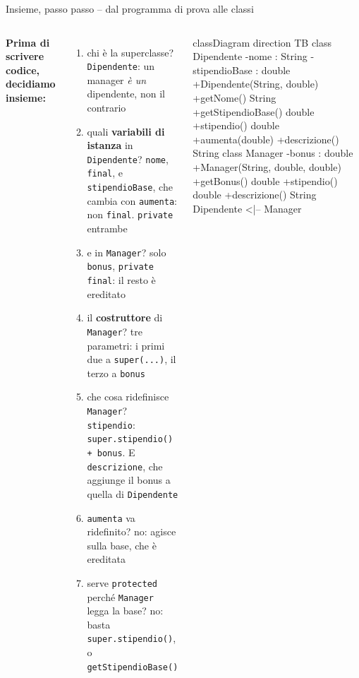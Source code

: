 \documentclass[10pt,aspectratio=169]{beamer}
\begin{document}
\begin{frame}[fragile]{Insieme, passo passo -- dal programma di prova alle classi}
\begin{columns}[T]
\footnotesize
\textbf{Prima di scrivere codice, decidiamo insieme:}
\begin{enumerate}\itemsep=2pt
    \item chi è la superclasse? \textrightarrow{} \texttt{Dipendente}: un manager \emph{è un} dipendente, non il contrario
    \item quali \textbf{variabili di istanza} in \texttt{Dipendente}? \textrightarrow{} \texttt{nome}, \texttt{final}, e \texttt{stipendioBase}, che cambia con \texttt{aumenta}: non \texttt{final}. \texttt{private} entrambe
    \item e in \texttt{Manager}? \textrightarrow{} solo \texttt{bonus}, \texttt{private final}: il resto è ereditato
    \item il \textbf{costruttore} di \texttt{Manager}? \textrightarrow{} tre parametri: i primi due a \texttt{super(...)}, il terzo a \texttt{bonus}
    \item che cosa ridefinisce \texttt{Manager}? \textrightarrow{} \texttt{stipendio}: \texttt{super.stipendio() + bonus}. E \texttt{descrizione}, che aggiunge il bonus a quella di \texttt{Dipendente}
    \item \texttt{aumenta} va ridefinito? \textrightarrow{} no: agisce sulla base, che è ereditata
    \item serve \texttt{protected} perché \texttt{Manager} legga la base? \textrightarrow{} no: basta \texttt{super.stipendio()}, o \texttt{getStipendioBase()}
\end{enumerate}

\begin{mermaid}
classDiagram
  direction TB
  class Dipendente {
    -nome : String
    -stipendioBase : double
    +Dipendente(String, double)
    +getNome() String
    +getStipendioBase() double
    +stipendio() double
    +aumenta(double)
    +descrizione() String
  }
  class Manager {
    -bonus : double
    +Manager(String, double, double)
    +getBonus() double
    +stipendio() double
    +descrizione() String
  }
  Dipendente <|-- Manager
\end{mermaid}
\end{columns}
\end{frame}
\end{document}
